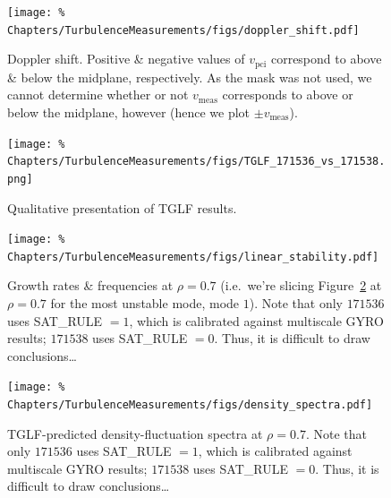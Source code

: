 \begin{figure}[h!]
  \centering
  \texttt{[image: \%
    Chapters/TurbulenceMeasurements/figs/doppler\_shift.pdf]}
  \caption[Doppler shift]{%
    Doppler shift. Positive \& negative values of $v_{\text{pci}}$
    correspond to above \& below the midplane, respectively.
    As the mask was not used, we cannot determine whether or not
    $v_{\text{meas}}$ corresponds to above or below the midplane, however
    (hence we plot $\pm v_{\text{meas}}$).
  }
\label{fig:TurbulenceMeasurements:doppler_shift}
\end{figure}

\begin{figure}[h!]
  \centering
  \texttt{[image: \%
    Chapters/TurbulenceMeasurements/figs/TGLF\_171536\_vs\_171538.png]}
  \caption[Qualitative presentation of TGLF results]{%
    Qualitative presentation of TGLF results.
  }
\label{fig:TurbulenceMeasurements:TGLF_171536_vs_171538}
\end{figure}

\begin{figure}[h!]
  \centering
  \texttt{[image: \%
    Chapters/TurbulenceMeasurements/figs/linear\_stability.pdf]}
  \caption[Growth rates \& frequencies at $\rho=0.7$]{%
    Growth rates \& frequencies at $\rho=0.7$
    (i.e.\ we're slicing
    Figure~\ref{fig:TurbulenceMeasurements:TGLF_171536_vs_171538}
    at $\rho = 0.7$ for the most unstable mode, mode $1$).
    Note that only $171536$ uses SAT\_RULE $= 1$,
    which is calibrated against multiscale GYRO results;
    $171538$ uses SAT\_RULE $= 0$.
    Thus, it is difficult to draw conclusions\ldots
  }
\label{fig:TurbulenceMeasurements:linear_stability}
\end{figure}

\begin{figure}[h!]
  \centering
  \texttt{[image: \%
    Chapters/TurbulenceMeasurements/figs/density\_spectra.pdf]}
  \caption[TGLF-predicted density-fluctuation spectra at $\rho=0.7$]{%
    TGLF-predicted density-fluctuation spectra at $\rho=0.7$.
    Note that only $171536$ uses SAT\_RULE $= 1$,
    which is calibrated against multiscale GYRO results;
    $171538$ uses SAT\_RULE $= 0$.
    Thus, it is difficult to draw conclusions\ldots
  }
\label{fig:TurbulenceMeasurements:density_spectra}
\end{figure}




